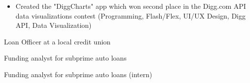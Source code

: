 \begin{itemize}
  \item Created the "DiggCharts" app which won second place in the Digg.com API data visualizations contest {\tiny (Programming, Flash/Flex, UI/UX Design, Digg API, Data Visualization)}
\end{itemize}

\divider



Loan Officer at a local credit union

\divider

Funding analyst for subprime auto loans

\divider

Funding analyst for subprime auto loans (intern)

\bigskip

